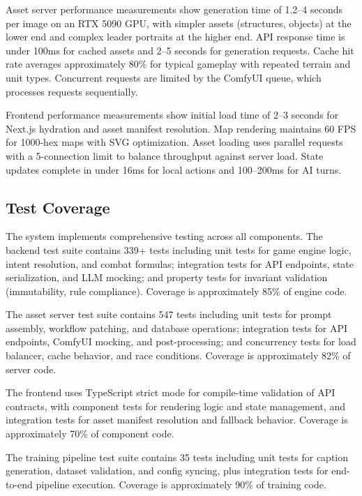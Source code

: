 \documentclass[conference]{IEEEtran}
\begin{document}
Asset server performance measurements show generation time of 1.2--4 seconds per image on an RTX 5090 GPU, with simpler assets (structures, objects) at the lower end and complex leader portraits at the higher end. API response time is under 100ms for cached assets and 2--5 seconds for generation requests. Cache hit rate averages approximately 80\% for typical gameplay with repeated terrain and unit types. Concurrent requests are limited by the ComfyUI queue, which processes requests sequentially.

Frontend performance measurements show initial load time of 2--3 seconds for Next.js hydration and asset manifest resolution. Map rendering maintains 60 FPS for 1000-hex maps with SVG optimization. Asset loading uses parallel requests with a 5-connection limit to balance throughput against server load. State updates complete in under 16ms for local actions and 100--200ms for AI turns.

\subsection{Test Coverage}

The system implements comprehensive testing across all components. The backend test suite contains 339+ tests including unit tests for game engine logic, intent resolution, and combat formulas; integration tests for API endpoints, state serialization, and LLM mocking; and property tests for invariant validation (immutability, rule compliance). Coverage is approximately 85\% of engine code.

The asset server test suite contains 547 tests including unit tests for prompt assembly, workflow patching, and database operations; integration tests for API endpoints, ComfyUI mocking, and post-processing; and concurrency tests for load balancer, cache behavior, and race conditions. Coverage is approximately 82\% of server code.

The frontend uses TypeScript strict mode for compile-time validation of API contracts, with component tests for rendering logic and state management, and integration tests for asset manifest resolution and fallback behavior. Coverage is approximately 70\% of component code.

The training pipeline test suite contains 35 tests including unit tests for caption generation, dataset validation, and config syncing, plus integration tests for end-to-end pipeline execution. Coverage is approximately 90\% of training code.
\end{document}
